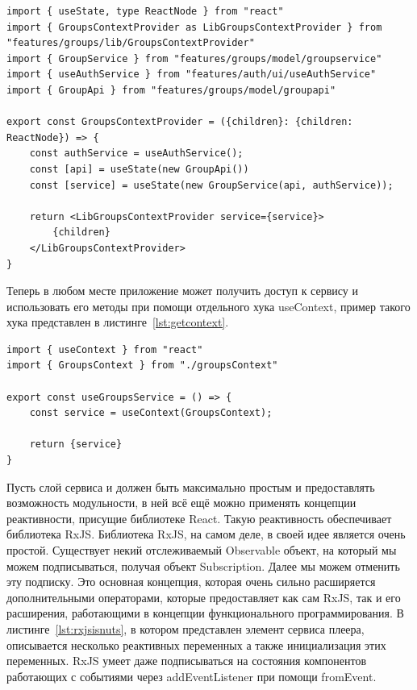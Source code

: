 \documentclass[14pt]{extarticle}
\begin{document}
\begin{lstlisting}[caption={Предоставление сервиса в контексте}, label={lst:setcontext}]
import { useState, type ReactNode } from "react"
import { GroupsContextProvider as LibGroupsContextProvider } from "features/groups/lib/GroupsContextProvider"
import { GroupService } from "features/groups/model/groupservice"
import { useAuthService } from "features/auth/ui/useAuthService"
import { GroupApi } from "features/groups/model/groupapi"

export const GroupsContextProvider = ({children}: {children: ReactNode}) => {
    const authService = useAuthService();
    const [api] = useState(new GroupApi())
    const [service] = useState(new GroupService(api, authService));
    
    return <LibGroupsContextProvider service={service}>
        {children}
    </LibGroupsContextProvider>
}
\end{lstlisting}

Теперь в любом месте приложение может получить доступ к сервису и использовать его методы при помощи отдельного хука useContext, пример такого хука представлен 
в листинге~\ref{lst:getcontext}.

\begin{lstlisting}[caption={Получение контекста в приложении}, label={lst:getcontext}]
import { useContext } from "react"
import { GroupsContext } from "./groupsContext"

export const useGroupsService = () => {
    const service = useContext(GroupsContext);

    return {service}
}
\end{lstlisting}

Пусть слой сервиса и должен быть максимально простым и предоставлять возможность модульности, в ней всё ещё можно применять концепции
реактивности, присущие библиотеке React. Такую реактивность обеспечивает библиотека RxJS. Библиотека RxJS, на самом деле, в своей идее
является очень простой. Существует некий отслеживаемый Observable объект, на который мы можем подписываться, получая объект Subscription.
Далее мы можем отменить эту подписку. Это основная концепция, которая очень сильно расширяется дополнительными операторами, которые предоставляет
как сам RxJS, так и его расширения, работающими в концепции функционального программирования. В листинге~\ref{lst:rxjsisnuts}, в котором представлен
элемент сервиса плеера, описывается несколько реактивных переменных а также инициализация этих переменных. RxJS умеет даже подписываться на состояния
компонентов работающих с событиями через addEventListener при помощи fromEvent.
\end{document}
